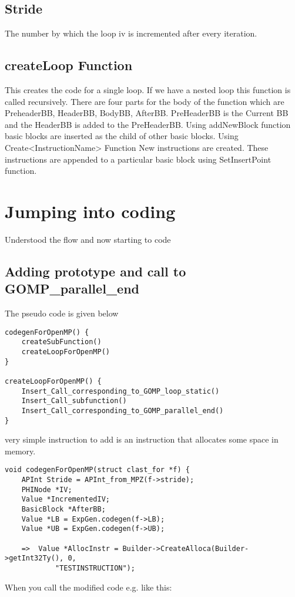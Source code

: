 \documentclass[a4paper,10pt]{article}
\begin{document}
\subsection{Stride}
The number by which the loop iv is incremented after every iteration.
\subsection{createLoop Function}
This creates the code for a single loop. If we have a nested loop this function is called recursively.
There are four parts for the body of the function which are PreheaderBB, HeaderBB, BodyBB, AfterBB. 
PreHeaderBB is the Current BB and the HeaderBB is added to the PreHeaderBB. 
Using addNewBlock function basic blocks are inserted as the child of other basic blocks. Using 
Create<InstructionName> Function New instructions are created. These instructions are appended to a 
particular basic block using SetInsertPoint function. 


\section{Jumping into coding}

Understood the flow and now starting to code

\subsection{Adding prototype and call to GOMP\_parallel\_end}
The pseudo code is given below
\begin{verbatim}
codegenForOpenMP() {
    createSubFunction()
    createLoopForOpenMP()
}

createLoopForOpenMP() {
    Insert_Call_corresponding_to_GOMP_loop_static()
    Insert_Call_subfunction()
    Insert_Call_corresponding_to_GOMP_parallel_end()
}
\end{verbatim}
very simple instruction to add is an instruction that allocates some space in memory.

\begin{verbatim}
void codegenForOpenMP(struct clast_for *f) {
    APInt Stride = APInt_from_MPZ(f->stride);
    PHINode *IV;
    Value *IncrementedIV;
    BasicBlock *AfterBB;
    Value *LB = ExpGen.codegen(f->LB);
    Value *UB = ExpGen.codegen(f->UB);

    =>  Value *AllocInstr = Builder->CreateAlloca(Builder->getInt32Ty(), 0,
            "TESTINSTRUCTION");

\end{verbatim}
When you call the modified code e.g. like this:
\end{document}
